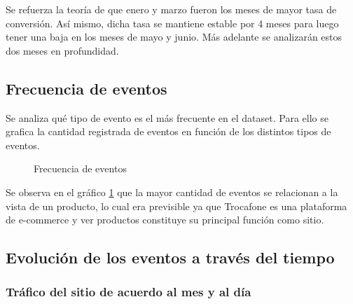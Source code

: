 \documentclass[a4paper]{article}
\begin{document}
Se refuerza la teoría de que enero y marzo fueron los meses de mayor tasa de conversión. Así mismo, dicha tasa se mantiene estable por 4 meses para luego tener una baja en los meses de mayo y junio. Más adelante se analizarán estos dos meses en profundidad.

\subsection{Frecuencia de eventos}

Se analiza qué tipo de evento es el más frecuente en el dataset. Para ello se grafica la cantidad registrada de eventos en función de los distintos tipos de eventos.

\begin{figure}[!h]
	\caption{Frecuencia de eventos}
	\label{fig:freqeventos}
\end{figure}

Se observa en el gráfico \ref{fig:freqeventos} que la mayor cantidad de eventos se relacionan a la vista de un producto, lo cual era previsible ya que Trocafone es una plataforma de e-commerce y ver productos constituye su principal función como sitio.

\subsection{Evolución de los eventos a través del tiempo}

\subsubsection{Tráfico del sitio de acuerdo al mes y al día}
\end{document}
